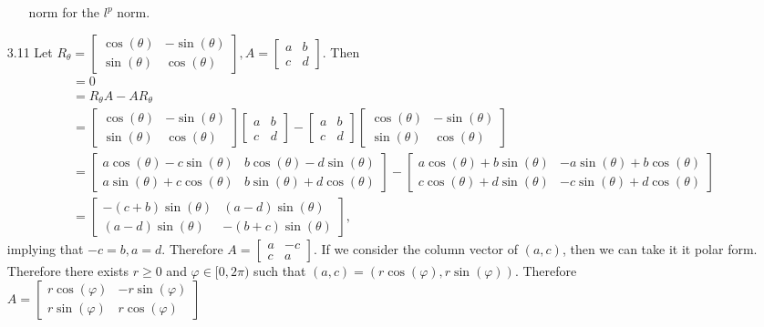 \documentclass[12pt, letterpaper]{article}
\begin{document}
\begin{enumerate}
\begin{enumerate}
		norm for the $l^p$ norm.  
	\end{enumerate}
	\item[3.11]
	Let $R_\theta = \begin{bmatrix}
		\cos(\theta) & - \sin(\theta)\\
		\sin(\theta) & \cos(\theta)
\end{bmatrix}, A = \begin{bmatrix}
a & b\\ c & d
\end{bmatrix}	 $.  Then 
	\begin{align*}
	&= 0\\
		&= R_\theta A - A R_\theta \\
		&= \begin{bmatrix}
		\cos(\theta) & - \sin(\theta)\\
		\sin(\theta) & \cos(\theta)
\end{bmatrix} \begin{bmatrix}
a & b\\ c & d
\end{bmatrix} - \begin{bmatrix}
a & b\\ c & d
\end{bmatrix} \begin{bmatrix}
		\cos(\theta) & - \sin(\theta)\\
		\sin(\theta) & \cos(\theta)
\end{bmatrix} \\
	&= \begin{bmatrix}
	a \cos(\theta) - c \sin(\theta) & b \cos(\theta) - d \sin(\theta)\\
	a \sin(\theta) + c \cos(\theta) & b \sin(\theta) + d \cos(\theta)
	\end{bmatrix} - 
	 \begin{bmatrix}
	a \cos(\theta) + b \sin(\theta) & -a \sin(\theta) + b \cos(\theta)\\
	c \cos(\theta) + d \sin(\theta) & -c \sin(\theta) + d \cos(\theta)
	\end{bmatrix} \\
	&= 
	\begin{bmatrix}
		-(c+b)\sin(\theta) & (a-d)\sin(\theta)\\
		(a-d)\sin(\theta) & -(b+c)\sin(\theta)
	\end{bmatrix},
	\end{align*}
	implying that $-c = b, a = d$.  Therefore 
	$A = \begin{bmatrix}
	a & -c\\ c & a
	\end{bmatrix}$.  If we consider the column vector of $(a,c)$, then 
	we can take it it polar form.  Therefore there exists $r \geq 0$ 
	and $\varphi \in [0,2 \pi)$ such that $(a,c) = (r \cos(\varphi),
	r \sin(\varphi))$.  Therefore 
	$A = \begin{bmatrix}
		r\cos(\varphi) & - r\sin(\varphi)\\
		r\sin(\varphi) & r\cos(\varphi)
\end{bmatrix}$
\end{enumerate}
\end{document}
